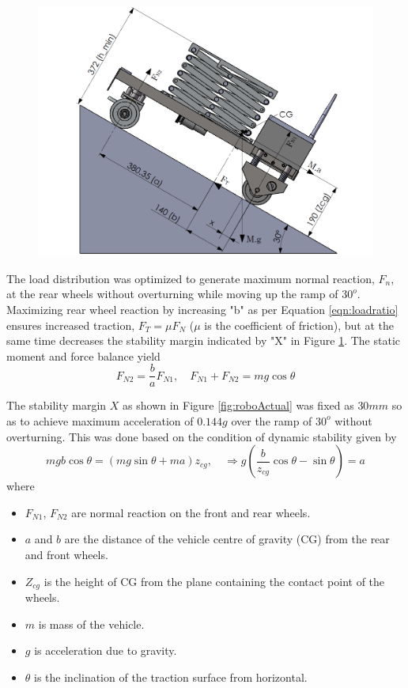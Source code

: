    \begin{figure}[h]
   	\centering
   	\includegraphics[width=0.85\linewidth,keepaspectratio]{Chapter3/fig/loadDist}
   	\label{fig:loadDistribution}
   \end{figure}

  The load distribution was optimized to generate maximum normal reaction, $F_n$,  at the rear wheels without overturning while moving up the ramp of $30^o$. Maximizing rear wheel reaction by increasing  "b" as per Equation \ref{eqn:loadratio} ensures increased traction, $F_T=\mu F_N$ ($\mu$ is the coefficient of friction), but at the same time decreases the stability margin indicated by "X" in Figure \ref{fig:loadDistribution}. The static moment and force balance yield
\begin{equation}
\label{eqn:loadratio}
F_{N2}=\dfrac{b}{a}F_{N1}, \quad F_{N1}+F_{N2}=mg\cos\theta
\end{equation}

The stability margin $X$ as shown in Figure \ref{fig:roboActual} was fixed as $30mm$ so as to achieve  maximum acceleration of $0.144g$  over the ramp of $30^o$ without overturning. This was done based on the condition of dynamic stability given by
\begin{equation}
\label{eqn:overturn}
mgb\cos\theta=(mg\sin\theta+ma)z_{cg}, \quad \Rightarrow g(\frac{b}{z_{cg}}\cos\theta-\sin\theta)=a
\end{equation}
where 
\begin{itemize}
\item[] $F_{N1}$, $F_{N2}$ are normal reaction on the front and rear wheels.
\item[] $a$ and $b$ are the distance of the vehicle centre of gravity (CG) from the rear and front wheels.
\item [] $Z_{cg}$ is the height of  CG from the  plane containing the contact point of the wheels.
\item [] $m$ is mass of the vehicle.
\item [] $g$ is acceleration due to gravity.
\item[] $\theta$ is the inclination of the traction surface from horizontal.
\end{itemize}


